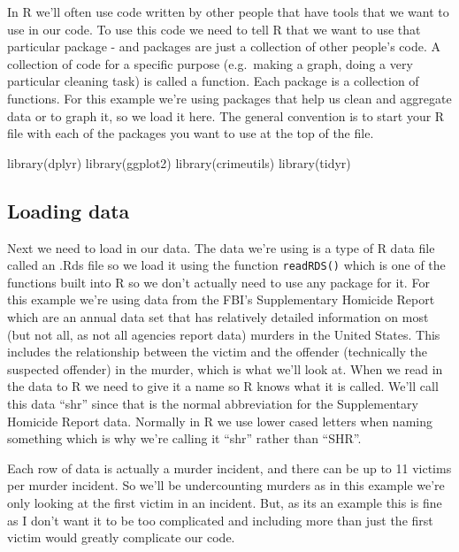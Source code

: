 \documentclass[
]{krantz}
\makeatletter
\newenvironment{Shaded}{\begin{snugshade}}{\end{snugshade}}
\newcommand{\FunctionTok}[1]{\textcolor[rgb]{0,0,0}{#1}}
\newcommand{\NormalTok}[1]{#1}
\newenvironment{kframe}{%
\medskip{}
\setlength{\fboxsep}{.8em}
 \def\at@end@of@kframe{}%
 \ifinner\ifhmode%
  \def\at@end@of@kframe{\end{minipage}}%
  \begin{minipage}{\columnwidth}%
 \fi\fi%
 \def\FrameCommand##1{\hskip\@totalleftmargin \hskip-\fboxsep
 \colorbox{shadecolor}{##1}\hskip-\fboxsep
     \hskip-\linewidth \hskip-\@totalleftmargin \hskip\columnwidth}%
 \MakeFramed {\advance\hsize-\width
   \@totalleftmargin\z@ \linewidth\hsize
   \@setminipage}}%
 {\par\unskip\endMakeFramed%
 \at@end@of@kframe}
\renewenvironment{Shaded}{\begin{kframe}}{\end{kframe}}
\makeatother
\begin{document}
In R we'll often use code written by other people that have
tools that we want to use in our code. To use this code we
need to tell R that we want to use that particular package -
and packages are just a collection of other people's code. A
collection of code for a specific purpose (e.g.~making a
graph, doing a very particular cleaning task) is called a
function. Each package is a collection of functions. For
this example we're using packages that help us clean and
aggregate data or to graph it, so we load it here. The
general convention is to start your R file with each of the
packages you want to use at the top of the file.

\begin{Shaded}
\begin{Highlighting}[]
\FunctionTok{library}\NormalTok{(dplyr)}
\FunctionTok{library}\NormalTok{(ggplot2)}
\FunctionTok{library}\NormalTok{(crimeutils)}
\FunctionTok{library}\NormalTok{(tidyr)}
\end{Highlighting}
\end{Shaded}

\hypertarget{loading-data}{%
\subsection{Loading data}\label{loading-data}}

Next we need to load in our data. The data we're using is a
type of R data file called an .Rds file so we load it using
the function \texttt{readRDS()} which is one of the
functions built into R so we don't actually need to use any
package for it. For this example we're using data from the
FBI's Supplementary Homicide Report which are an annual data
set that has relatively detailed information on most (but
not all, as not all agencies report data) murders in the
United States. This includes the relationship between the
victim and the offender (technically the suspected offender)
in the murder, which is what we'll look at. When we read in
the data to R we need to give it a name so R knows what it
is called. We'll call this data ``shr'' since that is the
normal abbreviation for the Supplementary Homicide Report
data. Normally in R we use lower cased letters when naming
something which is why we're calling it ``shr'' rather than
``SHR''.

Each row of data is actually a murder incident, and there
can be up to 11 victims per murder incident. So we'll be
undercounting murders as in this example we're only looking
at the first victim in an incident. But, as its an example
this is fine as I don't want it to be too complicated and
including more than just the first victim would greatly
complicate our code.
\end{document}
